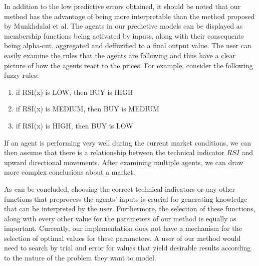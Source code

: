 \documentclass{ieeeaccess}
\begin{document}



In addition to the low predictive errors obtained, it should be noted
that our method has the advantage of being more interpretable than the
method proposed by Munkhdalai et al. The agents in our predictive models can
be displayed as membership functions being activated by inputs,
along with their consequents being alpha-cut, aggregated and
deffuzified to a final output value. The user can easily examine the
rules that the agents are following and thus have a clear picture of
how the agents react to the prices. For example, consider the
following fuzzy rules:

\begin{enumerate}
	\item if RSI(x) is LOW, then BUY is HIGH
	\item if RSI(x) is MEDIUM, then BUY is MEDIUM
	\item if RSI(x) is HIGH, then BUY is LOW
\end{enumerate}

If an agent is performing very well during the current market
conditions, we can then assume that there is a relationship between
the technical indicator $RSI$ and upward directional movements. After
examining multiple agents, we can draw more complex conclusions about
a market.



As can be concluded, choosing the correct technical indicators or any
other functions that preprocess the agents' inputs is crucial for
generating knowledge that can be interpreted by the user. Furthermore,
the selection of these functions, along with every other value for the
parameters of our method is equally as important. Currently, our
implementation does not have a mechanism for the selection of optimal
values for these parameters. A user of our method would need to search
by trial and error for values that yield desirable results according
to the nature of the problem they want to model.
\end{document}

